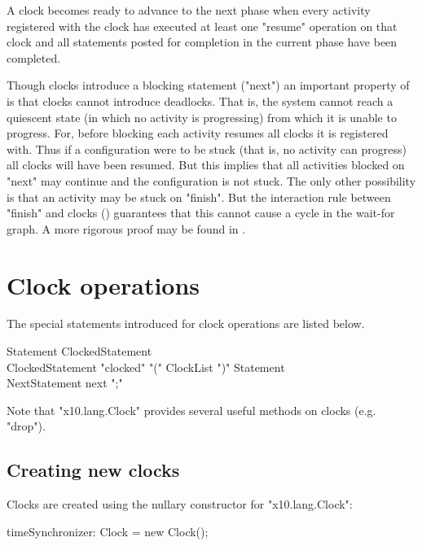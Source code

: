 A clock becomes ready to advance to the next phase when every activity
registered with the clock has executed at least one \xcd"resume"
operation on that clock and all statements posted for completion in
the current phase have been completed.

Though clocks introduce a blocking statement (\xcd"next") an important
property of \Xten{} is that clocks cannot introduce deadlocks. That
is, the system cannot reach a quiescent state (in which no activity is
progressing) from which it is unable to progress. For, before blocking
each activity resumes all clocks it is registered with. Thus if a
configuration were to be stuck (that is, no activity can progress) all
clocks will have been resumed. But this implies that all activities
blocked on \xcd"next" may continue and the configuration is not stuck.
The only other possibility is that an activity may be stuck on
\xcd"finish". But the interaction rule between \xcd"finish" and clocks
() guarantees that this cannot cause a cycle
in the wait-for graph. A more rigorous proof may be found in \cite{X10-concur05}.

\section{Clock operations}\label{sec:clock}
The special statements introduced for clock operations are listed below.

\begin{grammar}
Statement \: ClockedStatement \\
ClockedStatement \: \xcd"clocked" \xcd"(" ClockList \xcd")" Statement \\
NextStatement \: next \xcd";" \\
\end{grammar}

Note that \xcd"x10.lang.Clock" provides several useful methods on
clocks (e.g. \xcd"drop").

\subsection{Creating new clocks}\label{sec:clock:create}

Clocks are created using the nullary constructor for \xcd"x10.lang.Clock":

\begin{xten}
timeSynchronizer: Clock = new Clock();
\end{xten}

